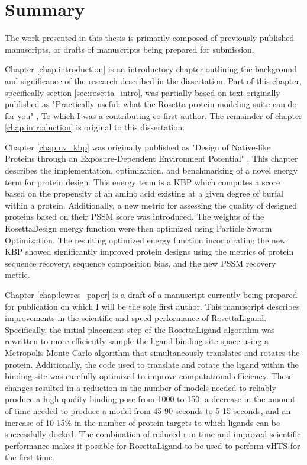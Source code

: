 \chapter*{Summary}
\vspace{7mm}

The work presented in this thesis is primarily composed of previously published manuscripts, or drafts of manuscripts being prepared for submission.

Chapter \ref{chap:introduction} is an introductory chapter outlining the background and significance of the research described in the dissertation.
Part of this chapter, specifically section \ref{sec:rosetta_intro}, was partially based on text originally published as "Practically useful: what the Rosetta protein modeling suite can do for you" \citep{Kaufmann:2010ea}, To which I was a contributing co-first author.
The remainder of chapter \ref{chap:introduction} is original to this dissertation.

Chapter \ref{chap:nv_kbp} was originally published as "Design of Native-like Proteins through an Exposure-Dependent Environment Potential" \citep{DeLuca:2011gg}.
This chapter describes the implementation, optimization, and benchmarking of a novel energy term for protein design.
This energy term is a \ac{KBP} which computes a score based on the propensity of an amino acid existing at a given degree of burial within a protein.
Additionally, a new metric for assessing the quality of designed proteins based on their \ac{PSSM} score was introduced.
The weights of the RosettaDesign energy function were then optimized using Particle Swarm Optimization.
The resulting optimized energy function incorporating the new \ac{KBP} showed significantly improved protein designs using the metrics of protein sequence recovery, sequence composition bias, and the new \ac{PSSM} recovery metric.

Chapter \ref{chap:lowres_paper} is a draft of a manuscript currently being prepared for publication on which I will be the sole first author.
This manuscript describes improvements in the scientific and speed performance of RosettaLigand.
Specifically, the initial placement step of the RosettaLigand algorithm was rewritten to more efficiently sample the ligand binding site space using a Metropolis Monte Carlo algorithm that simultaneously translates and rotates the protein.
Additionally, the code used to translate and rotate the ligand within the binding site was carefully optimized to improve computational efficiency.
These changes resulted in a reduction in the number of models needed to reliably produce a high quality binding pose from 1000 to 150, a decrease in the amount of time needed to produce a model from 45-90 seconds to 5-15 seconds, and an increase of 10-15\% in the number of protein targets to which ligands can be successfully docked.
The combination of reduced run time and improved scientific performance makes it possible for RosettaLigand to be used to perform \ac{vHTS} for the first time.

